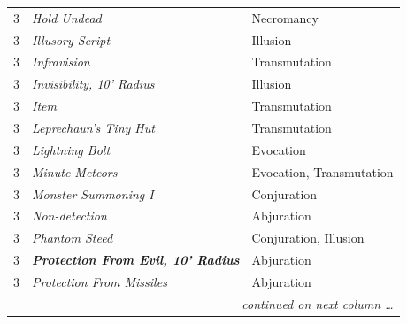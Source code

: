 \begin{multicols}{2}
\begin{tabular}{|p{}|p{}|p{}|}
3	& \textit{Hold Undead}	& Necromancy \\
\rowcolor[gray]{.9}3	& \textit{Illusory Script}	& Illusion \\
3	& \textit{Infravision}	& Transmutation \\
\rowcolor[gray]{.9}3	& \textit{Invisibility, 10' Radius}	& Illusion \\
3	& \textit{Item}	& Transmutation \\
\rowcolor[gray]{.9}3	& \textit{Leprechaun's Tiny Hut}	& Transmutation \\
3	& \textit{Lightning Bolt}	& Evocation \\
\rowcolor[gray]{.9}3	& \textit{Minute Meteors}	& Evocation, Transmutation \\
3	& \textit{Monster Summoning I}	& Conjuration \\
\rowcolor[gray]{.9}3	& \textit{Non-detection}	& Abjuration \\
3	& \textit{Phantom Steed}	& Conjuration, Illusion \\
\rowcolor[gray]{.9}3	& \textit{\textbf{Protection From Evil, 10' Radius}}	& Abjuration \\
3	& \textit{Protection From Missiles}	& Abjuration \\
\hline
\multicolumn{3}{r}{\textit{continued on next column \ldots}} \\
\end{tabular}


\end{multicols}
